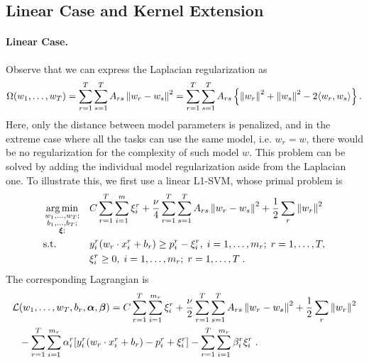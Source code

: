 \subsection{Linear Case and Kernel Extension}
\paragraph*{Linear Case.\\}
Observe that we can express the Laplacian regularization as
\begin{equation}
    \nonumber
    \Omega(w_1, \ldots, w_T) = \sum_{r=1}^T \sum_{s=1}^T A_{rs} \left\lVert w_r - w_s\right\rVert^2 =  \sum_{r=1}^T \sum_{s=1}^T A_{rs} \left\{ \left\lVert w_r\right\rVert^2 + \left\lVert w_s\right\rVert^2 - 2 \langle w_r, w_s \rangle \right\}.
\end{equation}
Here, only the distance between model parameters is penalized, and in the extreme case where all the tasks can use the same model, i.e. $w_r = w$, there would be no regularization for the complexity of such model $w$.
This problem can be solved by adding the individual model regularization aside from the Laplacian one.
To illustrate this, we first use a linear L1-SVM, whose primal problem is
\begin{equation}\label{eq:linear_gl_primal}
\begin{aligned}
& \argmin_{\substack{w_1, \ldots, w_\ntasks ; \\ \substack{b_1, \ldots, b_\ntasks } ; \\ \substack{\fv{\xi}}; }}
& & {C \sum_{r=1}^T \sum_{i=1}^m{\xi_{i}^r} + \frac{\nu}{4} \sum_{r=1}^T \sum_{s=1}^T A_{rs} \norm{w_r - w_s}^2 + \frac{1}{2} \sum_r \norm{w_r}^2 }\\
& \text{s.t.}
& & y_{i}^r ( w_r \cdot x_{i}^r + b_r) \geq p_{i}^r - \xi_{i}^r , \;  i=1,\ldots,m_r; \;  r=1,\ldots,T,\\
& & & \xi_{i}^r \geq 0, \;  i=1,\ldots,m_r; \;  r=1,\ldots,T \; .
\end{aligned}
\end{equation}
The corresponding Lagrangian is
\begin{equation}\label{eq:svmmtl_lagr_GL_addreg}
\begin{aligned}
        \mathcal{L}&(w_1, \ldots, w_\ntasks, b_r, \fv{\alpha}, \fv{\beta}) = C \sum_{r=1}^T \sum_{i=1}^{m_r}{\xi_{i}^r} + \frac{\nu}{2} \sum_{r=1}^T \sum_{s=1}^T A_{rs} \norm{w_r - w_s}^2 + \frac{1}{2} \sum_r \norm{w_r}^2 \\
        & - \sum_{r=1}^T \sum_{i=1}^{m_r}{ \alpha_i^r [y_{i}^r (w_r \cdot x_{i}^r + b_r) - p_{i}^r + \xi_{i}^r]   } - \sum_{r=1}^T \sum_{i=1}^{m_r}{ \beta_i^r \xi_i^r } \; .
\end{aligned}
\end{equation}
